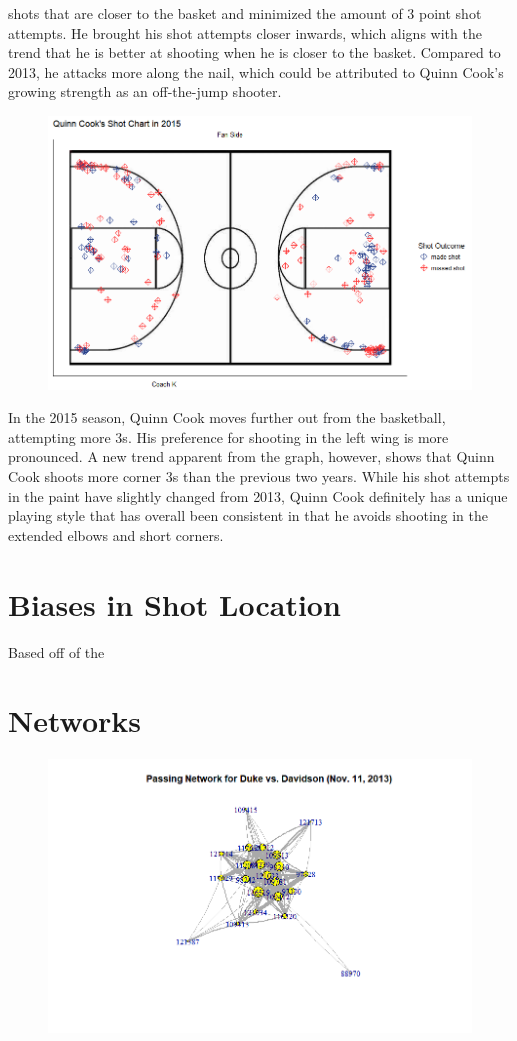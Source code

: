 \documentclass[12pt,twoside]{dukestatscithesis}
\theoremstyle{definition}
\theoremstyle{definition}
\theoremstyle{definition}
\theoremstyle{remark}
\begin{document}
shots that are closer to the basket and minimized the amount of 3 point
shot attempts. He brought his shot attempts closer inwards, which aligns
with the trend that he is better at shooting when he is closer to the
basket. Compared to 2013, he attacks more along the nail, which could be
attributed to Quinn Cook's growing strength as an off-the-jump shooter.
\begin{figure}
\centering
\includegraphics{img/shotchart_quinncook2015.png}
\caption{}
\end{figure}
In the 2015 season, Quinn Cook moves further out from the basketball,
attempting more 3s. His preference for shooting in the left wing is more
pronounced. A new trend apparent from the graph, however, shows that
Quinn Cook shoots more corner 3s than the previous two years. While his
shot attempts in the paint have slightly changed from 2013, Quinn Cook
definitely has a unique playing style that has overall been consistent
in that he avoids shooting in the extended elbows and short corners.

\section{Biases in Shot Location}\label{biases-in-shot-location}

Based off of the

\section{Networks}\label{networks}
\begin{figure}
\centering
\includegraphics{img/gamenetwork_ex.png}
\caption{}
\end{figure}
\end{document}
